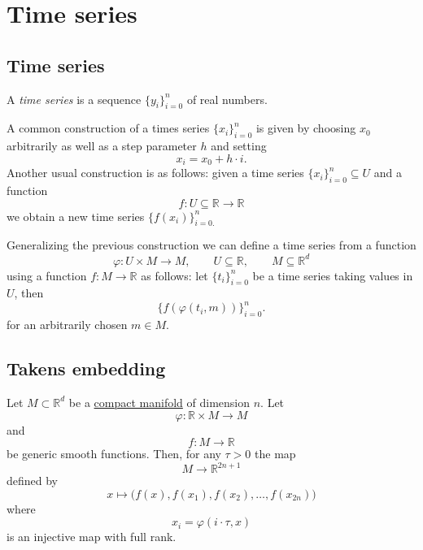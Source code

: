 \documentclass{amsart}
\begin{document}
	\section{Time series}
	
	\subsection*{Time series} \label{time series}
	
	A \textit{time series} is a sequence $\{y_i\}_{i = 0}^n$ of real numbers. 
	
	A common construction of a times series $\{x_i\}_{i = 0}^n$ is given by choosing $x_0$ arbitrarily as well as a step parameter $h$ and setting
	\begin{equation*}
	x_i = x_0 + h\cdot i.
	\end{equation*}
	Another usual construction is as follows: given a time series $\{x_i\}_{i = 0}^n \subseteq U$ and a function
	\begin{equation*}
	f : U \subseteq \mathbb R \to \mathbb R
	\end{equation*}
	we obtain a new time series $\{f(x_i)\}_{i = 0.}^n$
	
	Generalizing the previous construction we can define a time series from a function 
	\begin{equation*}
	\varphi : U \times M \to M, \qquad U \subseteq \mathbb R, \qquad M \subseteq \mathbb R^d
	\end{equation*} 
	using a function $f : M \to \mathbb R$ as follows: let $\{t_i\}_{i=0}^n$ be a time series taking values in $U$, then
	\begin{equation*}
	\{f(\varphi(t_i, m))\}_{i=0}^n.
	\end{equation*}
	for an arbitrarily chosen $m \in M$.
	
	\subsection*{Takens embedding}	\label{takens embedding}
	
	Let $M \subset \mathbb R^d$ be a \hyperref[manifold]{compact manifold} of dimension $n$. Let
	\begin{equation*}
	\varphi : \mathbb R \times M \to M
	\end{equation*} 
	and
	\begin{equation*}
	f : M \to \mathbb R
	\end{equation*}
	be generic smooth functions. Then, for any $\tau > 0$ the map
	\begin{equation*}
	M \to \mathbb R^{2n+1}
	\end{equation*}
	defined by
	\begin{equation*}
	x \mapsto\big( f(x), f(x_1), f(x_2), \dots, f(x_{2n}) \big)
	\end{equation*}
	where 
	\begin{equation*}
	x_i = \varphi(i \cdot \tau, x)
	\end{equation*}
	is an injective map with full rank.
	
\end{document}
